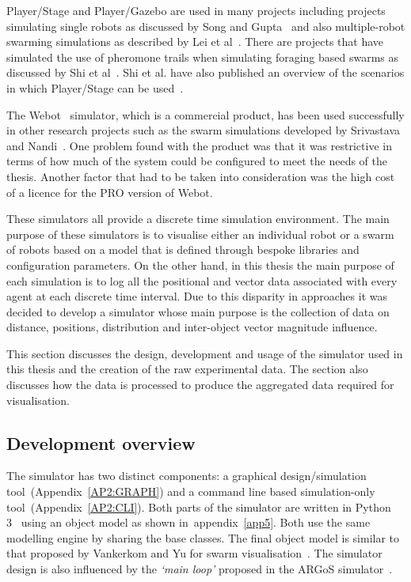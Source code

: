 Player/Stage and Player/Gazebo are used in many projects including projects simulating single robots as discussed by Song and Gupta~\cite{SG:15} and also multiple-robot swarming simulations as described by Lei et al~\cite{LLZ:08}. There are projects that have simulated the use of pheromone trails when simulating foraging based swarms as discussed by Shi et al~\cite{STZZW:13}. Shi et al. have also published an overview of the scenarios in which Player/Stage can be used~\cite{STWZZ:11}.

The Webot~\cite{CL:16} simulator, which is a commercial product, has been used successfully in other research projects such as the swarm simulations developed by Srivastava and Nandi~\cite{SN:10}. One problem found with the product was that it was restrictive in terms of how much of the system could be configured to meet the needs of the thesis. Another factor that had to be taken into consideration was the high cost of a licence for the PRO version of Webot.

These simulators all provide a discrete time simulation environment. The main purpose of these simulators is to visualise either an individual robot or a swarm of robots based on a model that is defined through bespoke libraries and configuration parameters. On the other hand, in this thesis the main purpose of each simulation is to log all the positional and vector data associated with every agent at each discrete time interval. Due to this disparity in approaches it was decided to develop a simulator whose main purpose is the collection of data on distance, positions, distribution and inter-object vector magnitude influence. 

This section discusses the design, development and usage of the simulator used in this thesis and the creation of the raw experimental data. The section also discusses how the data is processed to produce the aggregated data required for visualisation.


\subsection{Development overview}\label{sim:intro}
The simulator has two distinct components: a graphical design/simulation tool~(Appendix~\ref{AP2:GRAPH}) and a command line based simulation-only tool~(Appendix~\ref{AP2:CLI}). Both parts of the simulator are written in Python 3~\cite{PYTHON3:15} using an object model as shown in~appendix~\ref{app5}. Both use the same modelling engine by sharing the base classes.  The final object model is similar to that proposed by Vankerkom and Yu for swarm visualisation~\cite{VY:04}. The simulator design is also influenced by the \textit{`main loop'} proposed in the ARGoS simulator~\cite{PTOPB:11}.

